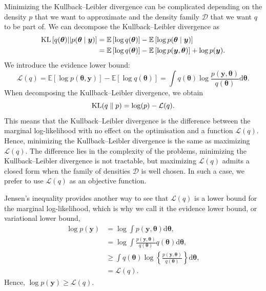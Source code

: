 \documentclass[a4paper, 11pt]{report}
\numberwithin{equation}{chapter}
\DeclareMathOperator*{\KL}{{\rm KL}}
\begin{document}
Minimizing the Kullback--Leibler divergence can be complicated depending on the density $p$ that we want to approximate and the density family $\mathcal{D}$ that we want $q$ to be part of. We can decompose the Kullback--Leibler divergence as
\begin{align*}
\KL\left[q(\boldsymbol{\theta})||p(\boldsymbol{\theta}\mid \boldsymbol{y})\right] &= \mathbb{E}\left[\log q(\boldsymbol{\theta})\right] - \mathbb{E}\left[\log p(\boldsymbol{\theta}\mid \boldsymbol{y})\right]\\
&= \mathbb{E}\left[\log q(\boldsymbol{\theta})\right] - \mathbb{E}\left[\log p(\boldsymbol{y},\boldsymbol{\theta})\right] + \log p(\boldsymbol{y}).
\end{align*}
We introduce the evidence lower bound:
\begin{equation*}
\mathcal{L}(q) = \mathbb{E}\left[\log p(\boldsymbol{\theta},\boldsymbol{y})\right] - \mathbb{E}\left[\log q(\boldsymbol{\theta})\right] =\int q(\boldsymbol{\theta})\log\frac{p(\boldsymbol{y},\boldsymbol{\theta})}{q(\boldsymbol{\theta})}\mathrm{d}\boldsymbol{\theta}.
\end{equation*}
When decomposing the Kullback--Leibler divergence, we obtain
\begin{equation*}
\KL(q\parallel p) = \log(p) - \mathcal{L}(q).
\end{equation*}
This means that the Kullback--Leibler divergence is the difference between the marginal log-likelihood with no effect on the optimisation and a function $\mathcal{L}(q)$. Hence, minimizing the Kullback--Leibler divergence is the same as maximizing $\mathcal{L}(q)$. The difference lies in the complexity of the problems, minimizing the Kullback--Leibler divergence is not tractable, but maximizing $\mathcal{L}(q)$ admits a closed form when the family of densities $\mathcal{D}$ is well chosen. In such a case, we prefer to use $\mathcal{L}(q)$ as an objective function.

Jensen's inequality provides another way to see that $\mathcal{L}(q)$ is a lower bound for the marginal log-likelihood, which is why we call it the evidence lower bound, or variational lower bound,
\begin{align*}
\log p(\boldsymbol{y}) &= \log \int p(\boldsymbol{y}, \boldsymbol{\theta}) \mathrm{d}\boldsymbol{\theta},\\
&= \log \int \frac{p(\boldsymbol{y}, \boldsymbol{\theta})}{q(\boldsymbol{\theta})}q(\boldsymbol{\theta})\mathrm{d}\boldsymbol{\theta}
,\\
&\geq \int q(\boldsymbol{\theta}) \log \left\lbrace \frac{p(\boldsymbol{y}, \boldsymbol{\theta})}{q(\boldsymbol{\theta})} \right\rbrace \mathrm{d}\boldsymbol{\theta},\\
&= \mathcal{L}(q).
\end{align*}
Hence, $\log p(\boldsymbol{y}) \geq \mathcal{L}(q)$.
\end{document}
